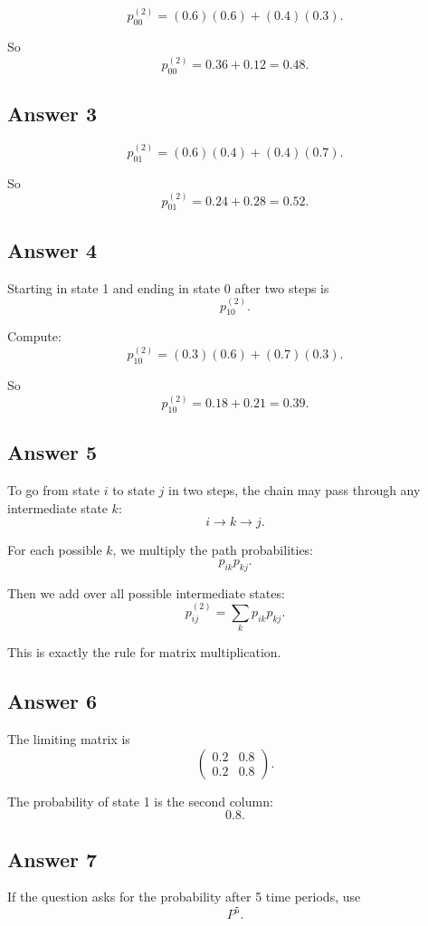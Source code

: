 \documentclass[12pt,a4paper]{article}
\theoremstyle{notestyle}
\begin{document}
\[
p_{00}^{(2)}
=(0.6)(0.6)+(0.4)(0.3).
\]

So
\[
p_{00}^{(2)}=0.36+0.12=0.48.
\]

\subsection*{Answer 3}

\[
p_{01}^{(2)}
=(0.6)(0.4)+(0.4)(0.7).
\]

So
\[
p_{01}^{(2)}=0.24+0.28=0.52.
\]

\subsection*{Answer 4}

Starting in state 1 and ending in state 0 after two steps is
\[
p_{10}^{(2)}.
\]

Compute:
\[
p_{10}^{(2)}
=(0.3)(0.6)+(0.7)(0.3).
\]

So
\[
p_{10}^{(2)}=0.18+0.21=0.39.
\]

\subsection*{Answer 5}

To go from state $i$ to state $j$ in two steps, the chain may pass through any intermediate state $k$:
\[
i\to k\to j.
\]

For each possible $k$, we multiply the path probabilities:
\[
p_{ik}p_{kj}.
\]

Then we add over all possible intermediate states:
\[
p_{ij}^{(2)}=\sum_k p_{ik}p_{kj}.
\]

This is exactly the rule for matrix multiplication.

\subsection*{Answer 6}

The limiting matrix is
\[
\begin{pmatrix}
0.2 & 0.8\\
0.2 & 0.8
\end{pmatrix}.
\]

The probability of state 1 is the second column:
\[
\boxed{0.8.}
\]

\subsection*{Answer 7}

If the question asks for the probability after 5 time periods, use
\[
P^5.
\]
\end{document}
